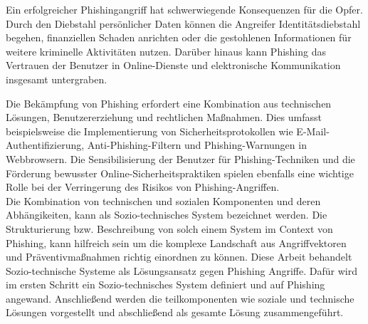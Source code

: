 \documentclass[journal=tosc,final]{iacrtrans}
\begin{document}
Ein erfolgreicher Phishingangriff hat schwerwiegende Konsequenzen für die Opfer. Durch den Diebstahl persönlicher Daten können die Angreifer Identitätsdiebstahl begehen, finanziellen Schaden anrichten oder die gestohlenen Informationen für weitere kriminelle Aktivitäten nutzen. Darüber hinaus kann Phishing das Vertrauen der Benutzer in Online-Dienste und elektronische Kommunikation insgesamt untergraben.

Die Bekämpfung von Phishing erfordert eine Kombination aus technischen Lösungen, Benutzererziehung und rechtlichen Maßnahmen. Dies umfasst beispielsweise die Implementierung von Sicherheitsprotokollen wie E-Mail-Authentifizierung, Anti-Phishing-Filtern und Phishing-Warnungen in Webbrowsern. Die Sensibilisierung der Benutzer für Phishing-Techniken und die Förderung bewusster Online-Sicherheitspraktiken spielen ebenfalls eine wichtige Rolle bei der Verringerung des Risikos von Phishing-Angriffen.\\ Die Kombination von technischen und sozialen Komponenten und deren Abhängikeiten, kann als Sozio-technisches System bezeichnet werden. Die Strukturierung bzw. Beschreibung von solch einem System im Context von Phishing, kann hilfreich sein um die komplexe Landschaft aus Angriffvektoren und Präventivmaßnahmen richtig einordnen zu können. Diese Arbeit behandelt Sozio-technische Systeme  als Lösungsansatz gegen Phishing Angriffe. Dafür wird im ersten Schritt ein Sozio-technisches System definiert und auf Phishing angewand. Anschließend werden die teilkomponenten wie soziale und technische Lösungen vorgestellt und abschließend als gesamte Lösung zusammengeführt. 


\newpage
\end{document}
